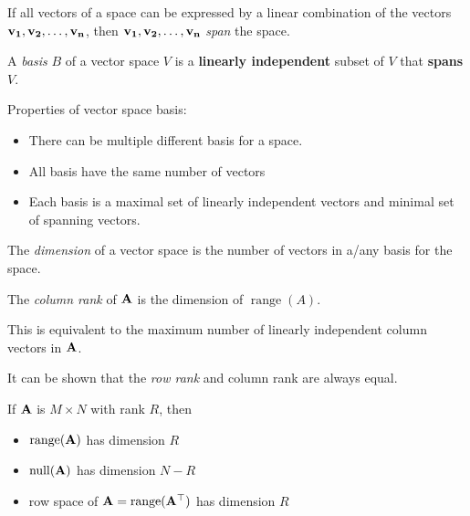 \begin{definition}
If all vectors of a space can be expressed by a linear combination of the vectors \(\mathbf{v_1}, \mathbf{v_2}, \ldots, \mathbf{v_n}\), then \(\mathbf{v_1}, \mathbf{v_2}, \ldots, \mathbf{v_n}\) \textit{span} the space.
\end{definition}

\begin{definition}[Basis]
A \textit{basis} \(B\) of a vector space \(V\) is a \textbf{linearly independent} subset of \(V\) that \textbf{spans} \(V\).
\end{definition}

Properties of vector space basis:
\begin{itemize}
\item There can be multiple different basis for a space.
\item All basis have the same number of vectors
\item Each basis is a maximal set of linearly independent vectors and minimal set of spanning vectors.
\end{itemize}

\begin{definition}[Dimension]
The \textit{dimension} of a vector space is the number of vectors in a/any basis for the space.
\end{definition}

\begin{definition}[Rank]
The \textit{column rank} of \(\mathbf{A}\) is the dimension of \(\operatorname{range}(A)\).

This is equivalent to the maximum number of linearly independent column vectors in \(\mathbf{A}\).

It can be shown that the \textit{row rank} and column rank are always equal.
\end{definition}

\begin{theorem}
If \(\mathbf{A}\) is \(M \times N\) with rank \(R\), then
\begin{itemize}
\item \(\operatorname{range}(\mathbf{A})\) has dimension \(R\)
\item \(\operatorname{null}(\mathbf{A})\) has dimension \(N - R\)
\item row space of \(\mathbf{A} = \operatorname{range}(\mathbf{A}^\top)\) has dimension \(R\)
\end{itemize}
\end{theorem}


